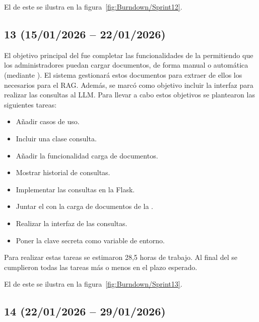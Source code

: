 El  de este  se ilustra en la figura~\ref{fig:Burndown/Sprint12}.

\subsection{ 13 (15/01/2026 -- 22/01/2026)}
El objetivo principal del  fue completar las funcionalidades de la  permitiendo que los administradores puedan cargar documentos, de forma manual o automática (mediante ). El sistema gestionará estos documentos para extraer de ellos los  necesarios para el RAG. Además, se marcó como objetivo incluir la interfaz para realizar las consultas al LLM. Para llevar a cabo estos objetivos se plantearon las siguientes tareas:
\begin{itemize}
\tightlist
	\item Añadir casos de uso.
	\item Incluir una clase consulta.
	\item Añadir la funcionalidad carga de documentos.
	\item Mostrar historial de consultas.
	\item Implementar las consultas en la  Flask.
	\item Juntar el  con la carga de documentos de la .
	\item Realizar la interfaz de las consultas.
	\item Poner la clave secreta como variable de entorno.
\end{itemize}

Para realizar estas tareas se estimaron 28,5 horas de trabajo. Al final del  se cumplieron todas las tareas más o menos en el plazo esperado.

El  de este  se ilustra en la figura~\ref{fig:Burndown/Sprint13}.

\subsection{ 14 (22/01/2026 -- 29/01/2026)}

